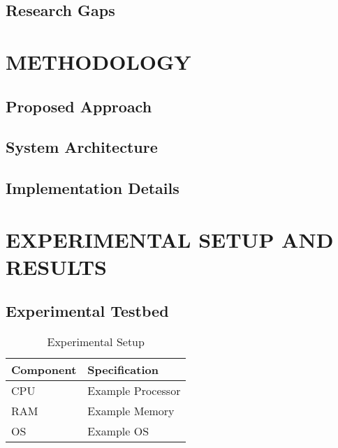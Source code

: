 \documentclass{SOICTthesis}  %
\begin{document}
\section{Research Gaps}
\lipsum[19-21]

\chapter{METHODOLOGY}
\section{Proposed Approach}
\lipsum[22-24]
\cite{b9}

\section{System Architecture}

\section{Implementation Details}
\lipsum[25-27]

\chapter{EXPERIMENTAL SETUP AND RESULTS}
\section{Experimental Testbed}
\lipsum[28-30]

\begin{table}[H]
\centering
\caption{Experimental Setup}
\begin{tabular}{|l|l|}
    \hline
    \textbf{Component} & \textbf{Specification} \\
    \hline
    CPU & Example Processor \\
    RAM & Example Memory \\
    OS  & Example OS \\
    \hline
\end{tabular}
\end{table}
\end{document}
